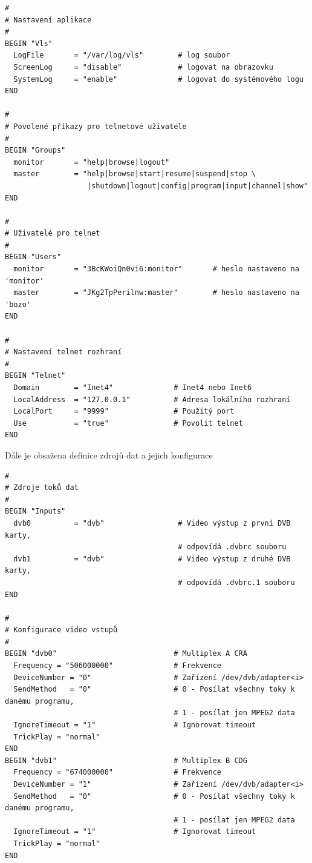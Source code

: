 \vspace{10pt}

\begin{small}
\begin{verbatim}
#
# Nastavení aplikace
#
BEGIN "Vls"
  LogFile       = "/var/log/vls"        # log soubor
  ScreenLog     = "disable"             # logovat na obrazovku
  SystemLog     = "enable"              # logovat do systémového logu
END

#
# Povolené příkazy pro telnetové uživatele
#
BEGIN "Groups"
  monitor       = "help|browse|logout"
  master        = "help|browse|start|resume|suspend|stop \
                   |shutdown|logout|config|program|input|channel|show"
END

#
# Uživatelé pro telnet
#
BEGIN "Users"
  monitor       = "3BcKWoiQn0vi6:monitor"       # heslo nastaveno na 'monitor'
  master        = "JKg2TpPerilnw:master"        # heslo nastaveno na 'bozo'
END

#
# Nastavení telnet rozhraní
#
BEGIN "Telnet"
  Domain        = "Inet4"              # Inet4 nebo Inet6
  LocalAddress  = "127.0.0.1"          # Adresa lokálního rozhraní
  LocalPort     = "9999"               # Použitý port
  Use           = "true"               # Povolit telnet
END
\end{verbatim}
\end{small}

\vspace{10pt}

Dále je obsažena definice zdrojů dat a jejich konfigurace

\vspace{10pt}

\begin{small}
\begin{verbatim}
#
# Zdroje toků dat
#
BEGIN "Inputs"
  dvb0          = "dvb"                 # Video výstup z první DVB karty, 
                                        # odpovídá .dvbrc souboru
  dvb1          = "dvb"                 # Video výstup z druhé DVB karty, 
                                        # odpovídá .dvbrc.1 souboru
END

#
# Konfigurace video vstupů
#
BEGIN "dvb0"                           # Multiplex A CRA
  Frequency = "506000000"              # Frekvence
  DeviceNumber = "0"                   # Zařízení /dev/dvb/adapter<i>
  SendMethod   = "0"                   # 0 - Posílat všechny toky k danému programu, 
                                       # 1 - posílat jen MPEG2 data
  IgnoreTimeout = "1"                  # Ignorovat timeout
  TrickPlay = "normal"                 
END
BEGIN "dvb1"                           # Multiplex B CDG
  Frequency = "674000000"              # Frekvence
  DeviceNumber = "1"                   # Zařízení /dev/dvb/adapter<i>
  SendMethod   = "0"                   # 0 - Posílat všechny toky k danému programu, 
                                       # 1 - posílat jen MPEG2 data
  IgnoreTimeout = "1"                  # Ignorovat timeout
  TrickPlay = "normal"
END
\end{verbatim}
\end{small}

